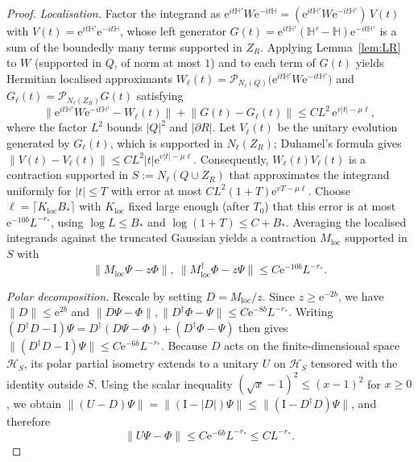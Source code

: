 \documentclass[aps,prx,reprint,superscriptaddress,floatfix,nofootinbib,longbibliography,amsmath,amssymb]{revtex4-2}
\newcommand{\id}{\mathrm{I}}
\newcommand{\norm}[1]{\lVert #1\rVert}
\newcommand{\abs}[1]{\lvert #1\rvert}
\newcommand{\cH}{\mathcal H}
\newcommand{\e}{\mathrm e}
\theoremstyle{plain}
\theoremstyle{definition}
\begin{document}
\begin{proof}
\emph{Localisation.} Factor the integrand as
$\e^{it\mathbb H'}W\e^{-it\mathbb H}=(\e^{it\mathbb H'}W\e^{-it\mathbb H'})\,V(t)$
with $V(t)=\e^{it\mathbb H'}\e^{-it\mathbb H}$, whose left generator
$G(t)=\e^{it\mathbb H'}(\mathbb H'-\mathbb H)\e^{-it\mathbb H'}$ is a sum of
the boundedly many terms supported in $Z_R$. Applying Lemma~\ref{lem:LR} to $W$ (supported in $Q$, of norm at most $1$)
and to each term of $G(t)$ yields Hermitian localised approximants
$W_\ell(t)=\mathcal P_{N_\ell(Q)}\bigl(\e^{it\mathbb H'}W\e^{-it\mathbb H'}\bigr)$
and $G_\ell(t)=\mathcal P_{N_\ell(Z_R)}G(t)$ satisfying
\[
 \norm{\e^{it\mathbb H'}W\e^{-it\mathbb H'}-W_\ell(t)}+\norm{G(t)-G_\ell(t)}\le CL^2\,\e^{v\abs t-\mu\ell},
\]
where the factor $L^2$ bounds $\abs Q^2$ and $\abs{\partial R}$. Let
$V_\ell(t)$ be the unitary evolution generated by $G_\ell(t)$, which is supported in
$N_\ell(Z_R)$; Duhamel's formula gives $\norm{V(t)-V_\ell(t)}\le CL^2\abs t\e^{v\abs t-\mu\ell}$.
Consequently, $W_\ell(t)V_\ell(t)$ is a contraction supported in
$S:=N_\ell(Q\cup Z_R)$ that approximates the integrand uniformly for
$\abs t\le T$ with error at most $CL^2(1+T)\e^{vT-\mu\ell}$. Choose
$\ell=\lceil K_{\mathrm{loc}}B_*\rceil$ with $K_{\mathrm{loc}}$ fixed large
enough (after $T_0$) that this error is at most $\e^{-10b}L^{-r_*}$,
using $\log L\le B_*$ and $\log(1+T)\le C+B_*$. Averaging the localised
integrands against the truncated Gaussian yields a contraction
$M_{\mathrm{loc}}$ supported in $S$ with
\begin{equation}\label{eq:loctwosided}
 \norm{M_{\mathrm{loc}}\Psi-z\Phi},\ \norm{M_{\mathrm{loc}}^\dagger\Phi-z\Psi}\le C\e^{-10b}L^{-r_*}.
\end{equation}

\emph{Polar decomposition.} Rescale by setting $D=M_{\mathrm{loc}}/z$. Since $z\ge\e^{-2b}$, we have $\norm D\le\e^{2b}$ and
$\norm{D\Psi-\Phi},\norm{D^\dagger\Phi-\Psi}\le C\e^{-8b}L^{-r_*}$. Writing
$(D^\dagger D-\id)\Psi=D^\dagger(D\Psi-\Phi)+(D^\dagger\Phi-\Psi)$ then gives
$\norm{(D^\dagger D-\id)\Psi}\le C\e^{-6b}L^{-r_*}$. Because $D$ acts on the finite-dimensional space $\cH_S$, its polar partial
isometry extends to a unitary $U$ on
$\cH_S$ tensored with the
identity outside $S$. Using the scalar inequality $(\sqrt x-1)^2\le(x-1)^2$ for $x\ge0$, we obtain
$\norm{(U-D)\Psi}=\norm{(\id-\abs D)\Psi}\le\norm{(\id-D^\dagger D)\Psi}$, and therefore
\begin{equation}\label{eq:Uerror}
 \norm{U\Psi-\Phi}\le C\e^{-6b}L^{-r_*}\le CL^{-r_*}.
\end{equation}


\end{proof}
\end{document}
